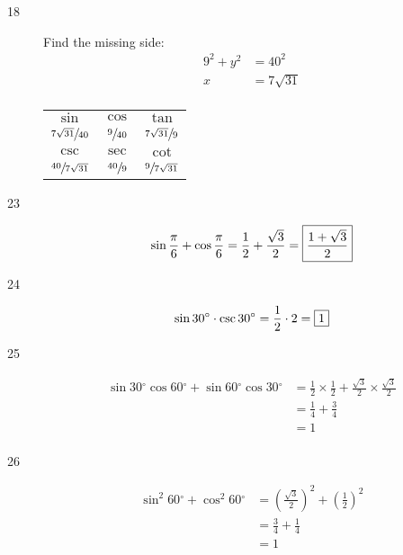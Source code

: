 \documentclass{exam}
\newcommand{\dg}{\ensuremath{^\circ}}
\begin{document}
\begin{description}
\begin{tabular}[H]{ccc}
          \bottomrule
        \end{tabular}

      \pagebreak

      \item[18] 
        Find the missing side:
        \begin{align*}
          9^2 + y^2 & = 40^2 \\
          x         & = 7 \sqrt{31} \\
        \end{align*}

        \begin{tabular}[H]{ccc}
          \toprule
          $\sin$                    & $\cos$          & $\tan$                   \\
          $\sfrac{7 \sqrt{31}}{40}$ & $\sfrac{9}{40}$ & $\sfrac{7 \sqrt{31}}{9}$ \\

          \midrule

          $\csc$                    & $\sec$          & $\cot$ \\
          $\sfrac{40}{7 \sqrt{31}}$ & $\sfrac{40}{9}$ & $\sfrac{9}{7 \sqrt{31}}$ \\

          \bottomrule
        \end{tabular}

      \item[23]
        \[
          \sin \frac{\pi}{6} + \cos \frac{\pi}{6} = \frac{1}{2} + \frac{\sqrt{3}}{2} = \boxed{ \frac{1 + \sqrt{3}}{2} } \\
        \]

      \item[24]
        \[
          \sin 30 \dg \cdot \csc 30 \dg = \frac{1}{2} \cdot 2 = \boxed{ 1 } \\
        \]

      \item[25]
        \begin{align*}
          \sin 30 \dg \cos 60 \dg + \sin 60 \dg \cos 30 \dg & =
            \frac{1}{2} \times \frac{1}{2} + \frac{\sqrt{3}}{2} \times \frac{\sqrt{3}}{2} \\
          & = \frac{1}{4} + \frac{3}{4} \\
          &= \boxed{ 1 } \\
        \end{align*}

      \item[26]
        \begin{align*}
          \sin^2 60 \dg + \cos^2 60 \dg & = \left( \frac{\sqrt{3}}{2} \right)^2 + \left( \frac{1}{2} \right)^2 \\
                                        & = \frac{3}{4} + \frac{1}{4} \\
                                        & = \boxed{ 1 } \\
        \end{align*}


\end{description}
\end{document}
